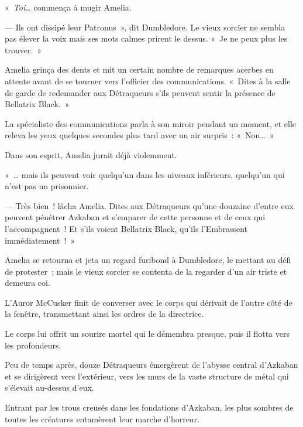«~\emph{Toi…} commença à mugir Amelia.

--- Ils ont dissipé leur Patronus~», dit Dumbledore.
Le vieux sorcier ne sembla pas élever la voix mais ses mots calmes prirent le dessus.
«~Je ne peux plus les trouver.~»

Amelia grinça des dents et mit un certain nombre de remarques acerbes en attente avant de se tourner vers l'officier des communications.
«~Dites à la salle de garde de redemander aux Détraqueurs s'ils peuvent sentir la présence de Bellatrix Black.~»

La spécialiste des communications parla à son miroir pendant un moment, et elle releva les yeux quelques secondes plus tard avec un air surpris~: «~Non…~»

Dans son esprit, Amelia jurait déjà violemment.

«~… mais ils peuvent voir quelqu'un dans les niveaux inférieurs, quelqu'un qui n'est pas un prisonnier.

--- Très bien~! lâcha Amelia.
Dites aux Détraqueurs qu'une douzaine d'entre eux peuvent pénétrer Azkaban et s'emparer de cette personne et de ceux qui l'accompagnent~!
Et s'ils voient Bellatrix Black, qu'ils l'Embrassent immédiatement~!~»

Amelia se retourna et jeta un regard furibond à Dumbledore, le mettant au défi de protester~; mais le vieux sorcier se contenta de la regarder d'un air triste et demeura coi.

\later

L'Auror McCusker finit de converser avec le corps qui dérivait de l'autre côté de la fenêtre, transmettant ainsi les ordres de la directrice.

Le corps lui offrit un sourire mortel qui le démembra presque, puis il flotta vers les profondeurs.

Peu de temps après, douze Détraqueurs émergèrent de l'abysse central d'Azkaban et se dirigèrent vers l'extérieur, vers les murs de la vaste structure de métal qui s'élevait au-dessus d'eux.

Entrant par les trous creusés dans les fondations d'Azkaban, les plus sombres de toutes les créatures entamèrent leur marche d'horreur.
